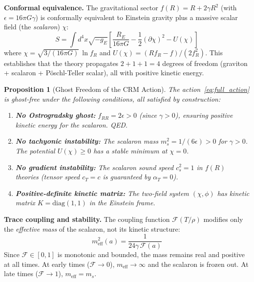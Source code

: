 \documentclass[aps,prd,twocolumn,superscriptaddress,nofootinbib]{revtex4-2}
\newtheorem{proposition}{Proposition}
\begin{document}
\textbf{Conformal equivalence.} The gravitational sector $f(R) = R + 2\gamma R^2$ (with $\epsilon = 16\pi G\gamma$) is conformally equivalent to Einstein gravity plus a massive scalar field (the \textit{scalaron}) $\chi$:
\begin{equation}
S = \int d^4x \sqrt{-g_E} \left[\frac{R_E}{16\pi G} - \frac{1}{2}(\partial\chi)^2 - U(\chi) \right]
\end{equation}
where $\chi = \sqrt{3/(16\pi G)}\,\ln f_R$ and $U(\chi) = (R f_R - f)/(2 f_R^2)$. This establishes that the theory propagates $2 + 1 + 1 = 4$ degrees of freedom (graviton + scalaron + P\"oschl-Teller scalar), all with positive kinetic energy.

{\sloppy
\begin{proposition}[Ghost Freedom of the CRM Action]
The action~\eqref{eq:full_action} is ghost-free under the following conditions, all satisfied by construction:
\begin{enumerate}
\item \textbf{No Ostrogradsky ghost:} $f_{RR} = 2\epsilon > 0$ (since $\gamma > 0$), ensuring positive kinetic energy for the scalaron. QED.
\item \textbf{No tachyonic instability:} The scalaron mass $m_s^2 = 1/(6\epsilon) > 0$ for $\gamma > 0$. The potential $U(\chi) \geq 0$ has a stable minimum at $\chi = 0$.
\item \textbf{No gradient instability:} The scalaron sound speed $c_s^2 = 1$ in $f(R)$ theories (tensor speed $c_T = c$ is guaranteed by $\alpha_T = 0$).
\item \textbf{Positive-definite kinetic matrix:} The two-field system $(\chi, \phi)$ has kinetic matrix $K = \mathrm{diag}(1, 1)$ in the Einstein frame.
\end{enumerate}
\end{proposition}
}

\textbf{Trace coupling and stability.} The coupling function $\mathcal{F}(T/\rho)$ modifies only the \textit{effective mass} of the scalaron, not its kinetic structure:
\begin{equation}
m_{\mathrm{eff}}^2(a) = \frac{1}{24\gamma\,\mathcal{F}(a)}
\end{equation}
Since $\mathcal{F} \in [0,1]$ is monotonic and bounded, the mass remains real and positive at all times. At early times ($\mathcal{F} \to 0$), $m_{\mathrm{eff}} \to \infty$ and the scalaron is frozen out. At late times ($\mathcal{F} \to 1$), $m_{\mathrm{eff}} = m_s$.
\end{document}
